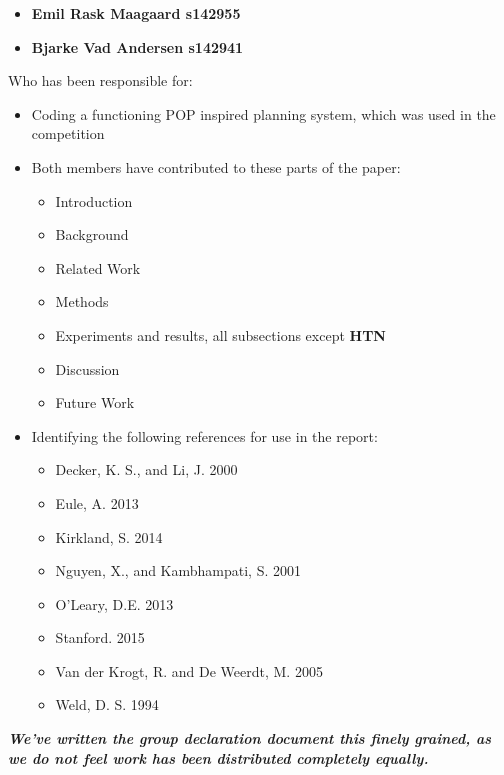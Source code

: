 \documentclass[letterpaper]{article}
\begin{document}
\begin{itemize}
\item \textbf{Emil Rask Maagaard s142955}
\item \textbf{Bjarke Vad Andersen s142941}
\end{itemize}

Who has been responsible for:
\begin{itemize}
\item Coding a functioning POP inspired planning system, which was used in the competition
\item Both members have contributed to these parts of the paper:
  \begin{itemize}
  \item Introduction
  \item Background
  \item Related Work
  \item Methods
  \item Experiments and results, all subsections except \textbf{HTN}
  \item Discussion
  \item Future Work
  \end{itemize}
\item Identifying the following references for use in the report:
  \begin{itemize}
  \item Decker, K. S., and Li, J. 2000
  \item Eule, A. 2013
  \item Kirkland, S. 2014
  \item Nguyen, X., and Kambhampati, S. 2001
  \item O'Leary, D.E. 2013
  \item Stanford. 2015
  \item Van der Krogt, R. and De Weerdt, M. 2005
  \item Weld, D. S. 1994
  \end{itemize}
\end{itemize}

\vspace{1cm}
\textbf{\textit{We've written the group declaration document this finely grained, as we do not feel work has been
distributed completely equally.}}
\end{document}
